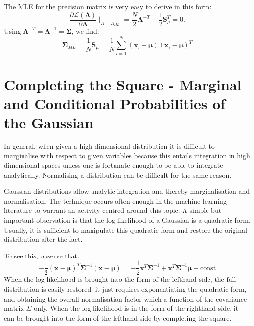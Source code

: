    The MLE for the precision matrix is very easy to derive in this form:
   $$
   \frac{\partial \mathcal{L}(\boldsymbol{\Lambda})}{\partial \boldsymbol{\Lambda}} \mid_{\Lambda = \Lambda_{ML}} = \frac{N}{2} \boldsymbol{\Lambda}^{-T} -
   \frac{1}{2}\boldsymbol{S}^T_{\mu} = 0. 
   $$
   Using $\boldsymbol{\Lambda}^{-T} = \boldsymbol{\Lambda}^{-1} = \boldsymbol{\Sigma}$, we find:
   \begin{equation}
     \boldsymbol{\Sigma}_{ML} = \frac{1}{N}\boldsymbol{S}_{\mu} = \frac{1}{N}\sum^N_{i=1}(\boldsymbol{x}_i - \boldsymbol{\mu})(\boldsymbol{x}_i - \boldsymbol{\mu})^T
     \label{eq-multivarMLE2}
   \end{equation}
    
   \section{Completing the Square - Marginal and Conditional Probabilities of the Gaussian}
   In general, when given a high dimensional distribution it is difficult to marginalise
   with respect to given variables because this entails integration in high dimensional
   spaces unless one is fortunate enough to be able to integrate analytically. Normalising
   a distribution can be difficult for the same reason.

   Gaussian distributions allow analytic integration and thereby marginalisation and normalisation. The technique occurs often enough
   in the machine learning literature to  warrant an activity centred around this topic.
   A simple but important observation is that the log likelihood of a Gaussian is a quadratic form. Usually, it is sufficient to manipulate
   this quadratic form and restore the original distribution after the fact.

   To see this, observe that:
   \begin{equation}
   -\frac{1}{2} (\boldsymbol{x} - \boldsymbol{\mu})^T \boldsymbol{\Sigma}^{-1} ( \boldsymbol{x} - \boldsymbol{\mu}) =
   -\frac{1}{2}\boldsymbol{x}^T \boldsymbol{\Sigma}^{-1} + \boldsymbol{x}^T \boldsymbol{\Sigma}^{-1} \boldsymbol{\mu} + \mbox{const}
   \end{equation}
   When the log likelihood is brought into the form of the lefthand side, the full distribution is easily restored: it just requires exponentiating the quadratic
   form, and obtaining the overall normalisation factor which a function of the covariance matrix $\Sigma$ only. When the log likelihood is in the form
   of the righthand side, it can be brought into the form of the lefthand side by completing the square.

